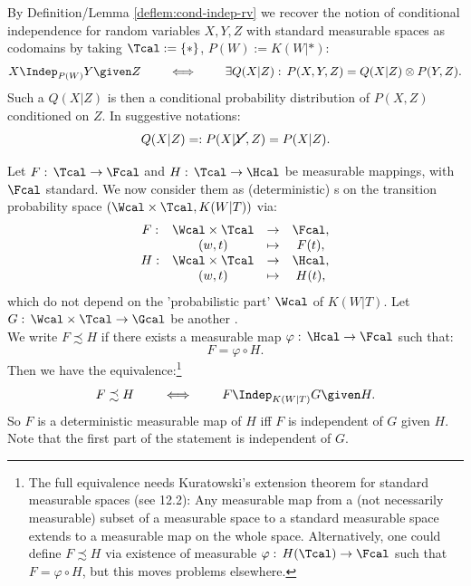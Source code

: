 \begin{Rem}
    \label{ci-random-variables}
    By Definition/Lemma \ref{deflem:cond-indep-rv} we recover the notion of conditional independence for random variables 
    $X,Y,Z$ with standard measurable spaces as codomains by taking $\Tcal:=\{\ast\}$, $P(W):=K(W|\ast)$:
\[ X \Indep_{P(W)} Y \given Z \qquad \iff \qquad \exists Q(X|Z):\, P(X,Y,Z) = Q(X|Z) \otimes P(Y,Z).\]
Such a $Q(X|Z)$ is then a conditional probability distribution of $P(X,Z)$ conditioned on $Z$.
In suggestive notations:
\[Q(X|Z) =:P(X|\cancel{Y},Z) = P(X|Z).\]
\end{Rem}



\begin{Lem}
    Let $F:\, \Tcal \to \Fcal$ and $H:\,\Tcal \to \Hcal$ be measurable mappings, with $\Fcal$ standard.
    We now consider them as (deterministic) \trv{}s on the transition probability space $(\Wcal \times \Tcal,K(W|T))$ via:
    \[\begin{array}{ccccc} 
        F: & \Wcal  \times \Tcal &\to &\Fcal,\\
           &(w,t) &\mapsto& F(t), \\
        H: & \Wcal  \times \Tcal &\to &\Hcal,\\
           &(w,t) &\mapsto& H(t), \\
    \end{array}\]
    which do not depend on the 'probabilistic part' $\Wcal$ of $K(W|T)$. Let $G:\, \Wcal \times \Tcal \to \Gcal$ be another \trv{}.\\
    We write $F \precsim H$ if there exists a measurable map $\varphi:\,\Hcal \to \Fcal$ such that:
    \[ F = \varphi \circ H. \]
    Then we have the equivalence:\footnote{The full equivalence needs Kuratowski's extension theorem for standard measurable spaces
    (see \cite{Kec95} 12.2): Any measurable map from a (not necessarily measurable) subset of a measurable space to a standard measurable space extends to a measurable map on the whole space. Alternatively, one could define $F \precsim H$ via existence of measurable $\varphi:\, H(\Tcal) \to \Fcal$ such that $F=\varphi \circ H$, but this moves problems elsewhere.}
    \[ F \precsim H \qquad \iff\qquad F \Indep_{K(W|T)} G \given H.\]
    So $F$ is a deterministic measurable map of $H$ iff $F$ is independent of $G$ given $H$. Note that the first part of the statement is independent of $G$.%

\end{Lem}

